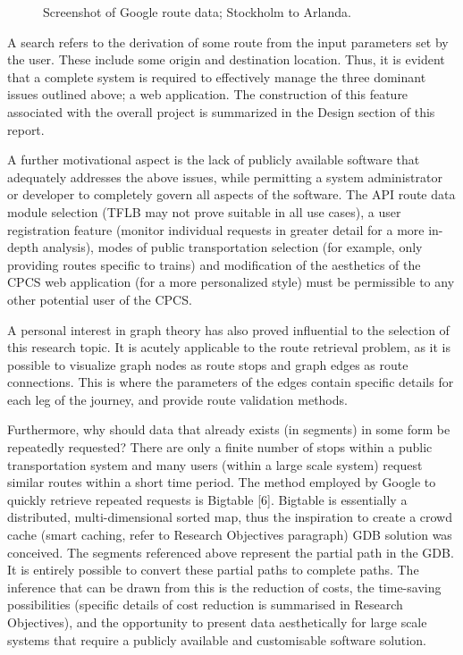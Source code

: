\documentclass[12pt]{article}   	%
\begin{document}
\noindent
\begin{figure}[htp]

\caption{Screenshot of Google route data; Stockholm to Arlanda.}
\end{figure}

A search refers to the derivation of some route from the input parameters set by the user. These include some origin and destination location. Thus, it is evident that a complete system is required to effectively manage the three dominant issues outlined above; a web application. The construction of this feature associated with the overall project is summarized in the Design section of this report.
	
A further motivational aspect is the lack of publicly available software that adequately addresses the above issues, while permitting a system administrator or developer to completely govern all aspects of the software. The API route data module selection (TFLB may not prove suitable in all use cases), a user registration feature (monitor individual requests in greater detail for a more in-depth analysis), modes of public transportation selection (for example, only providing routes specific to trains) and modification of the aesthetics of the CPCS web application (for a more personalized style) must be permissible to any other potential user of the CPCS.
	
A personal interest in graph theory has also proved influential to the selection of this research topic. It is acutely applicable to the route retrieval problem, as it is possible to visualize graph nodes as route stops and graph edges as route connections. This is where the parameters of the edges contain specific details for each leg of the journey, and provide route validation methods.
	
Furthermore, why should data that already exists (in segments) in some form be repeatedly requested? There are only a finite number of stops within a public transportation system and many users (within a large scale system) request similar routes within a short time period. The method employed by Google to quickly retrieve repeated requests is Bigtable [6]. Bigtable is essentially a distributed, multi-dimensional sorted map, thus the inspiration to create a crowd cache (smart caching, refer to Research Objectives paragraph) GDB solution was conceived. The segments referenced above represent the partial path in the GDB. It is entirely possible to convert these partial paths to complete paths. The inference that can be drawn from this is the reduction of costs, the time-saving possibilities (specific details of cost reduction is summarised in Research Objectives), and the opportunity to present data aesthetically for large scale systems that require a publicly available and customisable software solution.
\end{document}
